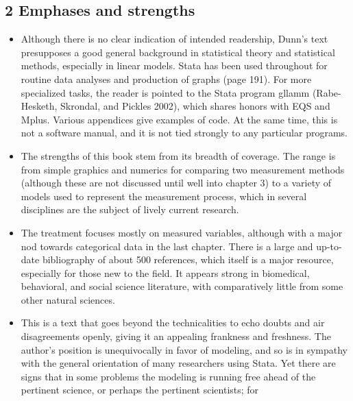 \newpage
\subsection{2 Emphases and strengths}



\begin{itemize}

\item Although there is no clear indication of intended readership, Dunn’s text presupposes a
good general background in statistical theory and statistical methods, especially in linear
models. Stata has been used throughout for routine data analyses and production of
graphs (page 191). For more specialized tasks, the reader is pointed to the Stata program
gllamm (Rabe-Hesketh, Skrondal, and Pickles 2002), which shares honors with EQS and
Mplus. Various appendices give examples of code. At the same time, this is not a
software manual, and it is not tied strongly to any particular programs.
\item The strengths of this book stem from its breadth of coverage. The range is from
simple graphics and numerics for comparing two measurement methods (although these
are not discussed until well into chapter 3) to a variety of models used to represent
the measurement process, which in several disciplines are the subject of lively current
research. 
\item The treatment focuses mostly on measured variables, although with a major
nod towards categorical data in the last chapter. There is a large and up-to-date bibliography
of about 500 references, which itself is a major resource, especially for those new
to the field. It appears strong in biomedical, behavioral, and social science literature,
with comparatively little from some other natural sciences.
\item This is a text that goes beyond the technicalities to echo doubts and air disagreements
openly, giving it an appealing frankness and freshness. The author’s position is
unequivocally in favor of modeling, and so is in sympathy with the general orientation of
many researchers using Stata. Yet there are signs that in some problems the modeling
is running free ahead of the pertinent science, or perhaps the pertinent scientists; for

\end{itemize}
